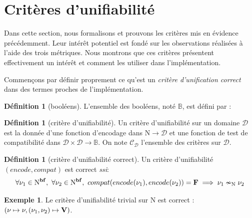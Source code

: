 \documentclass[a4paper]{report}
\theoremstyle{definition}
\newtheorem{definition}[theoreme]{Définition}
\newtheorem{exemple}[theoreme]{Exemple}
\newcommand{\ssi}{\textit{ssi}\xspace}
\newcommand{\N}{\mathrm{N}}
\begin{document}

\section{Critères d'unifiabilité}

Dans cette section, nous formalisons et prouvons les critères mis en évidence précédemment. Leur intérêt potentiel est fondé sur les observations réalisées à l'aide des trois métriques. Nous montrons que ces critères présentent effectivement un intérêt et comment les utiliser dans l'implémentation.

Commençons par définir proprement ce qu'est un \emph{critère d'unification correct} dans des termes proches de l'implémentation.

\begin{definition}[booléens]
  L'ensemble des booléens, noté $\mathbb{B}$, est défini par :
\end{definition}

\begin{definition}[critère d'unifiabilité]
  Un critère d'unifiabilité sur un domaine $\mathscr{D}$ est la donnée d'une fonction d'encodage dans $\N \rightarrow \mathscr{D}$ et une fonction de test de compatibilité dans $\mathscr{D} \times \mathscr{D} \rightarrow \mathbb{B}$. On note $\mathscr{C}_\mathscr{D}$ l'ensemble des critères sur $\mathscr{D}$.
\end{definition}

\begin{definition}[critère d'unifiabilité correct]
  Un critère d'unifiabilité $(encode, compat)$ est correct \ssi :
  \[ \forall \nu_1 \in \N^{\bold{bf}},\ \forall \nu_2 \in \N^{\bold{bf}},\ compat (encode (\nu_1), encode (\nu_2)) = \bold{F} \implies \nu_1 \nsim_\N \nu_2 \]
\end{definition}

\begin{exemple}
  Le critère d'unifiabilité trivial sur $\N$ est correct : $(\nu \mapsto \nu, (\nu_1, \nu_2) \mapsto \bold{V})$.
\end{exemple}

\end{document}
